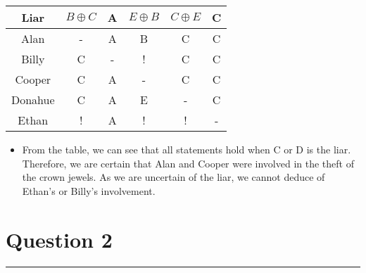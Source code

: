 \documentclass{article}
\begin{document}
\begin{enumerate}[label=\alph*.]
\begin{itemize}
          \end{itemize}
          \begin{center}
              \begin{tabular}{|c|c|c|c|c|c|}
                  \hline
                  Liar    & \( B \oplus C \) & A & \( E \oplus B \) & \( C \oplus E \) & C \\
                  \hline
                  Alan    & -                & A & B                & C                & C \\
                  Billy   & C                & - & !                & C                & C \\
                  Cooper  & C                & A & -                & C                & C \\
                  Donahue & C                & A & E                & -                & C \\
                  Ethan   & !                & A & !                & !                & - \\
                  \hline
              \end{tabular}
          \end{center}
          \begin{itemize}
              \item From the table, we can see that all statements hold when C or D is the liar. Therefore, we are certain that Alan and Cooper were involved in the theft of the crown jewels. As we are uncertain of the liar, we cannot deduce of Ethan's or Billy's involvement.
          \end{itemize}
\end{enumerate}

\section*{Question 2}
\hrule
\vspace{0.5cm}
\end{document}
